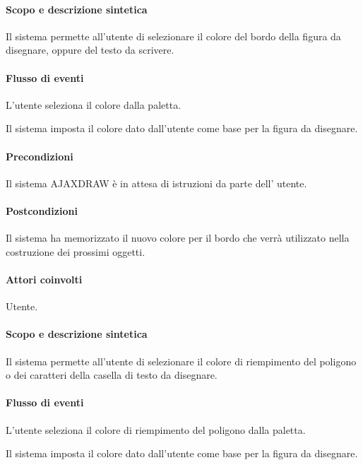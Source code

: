 \paragraph{Scopo e descrizione sintetica} 
Il sistema permette all'utente di selezionare il colore del bordo della figura da disegnare, oppure del testo da scrivere.
\paragraph{Flusso di eventi}
\begin{elenconumerato}[\textbf{}]{\subsubsecindent}
\item L'utente seleziona il colore dalla paletta.
\item Il sistema imposta il colore dato dall'utente come base per la figura da disegnare.
\end{elenconumerato}
\paragraph{Precondizioni} Il sistema AJAXDRAW \`e in attesa di istruzioni da parte dell' utente.
\paragraph{Postcondizioni} Il sistema ha memorizzato il nuovo colore per il bordo che verr\`a utilizzato nella costruzione dei prossimi oggetti.

\paragraph{Attori coinvolti} Utente.
\paragraph{Scopo e descrizione sintetica} 
Il sistema permette all'utente di selezionare il colore di riempimento del poligono o dei caratteri della casella di testo da disegnare.
\paragraph{Flusso di eventi}
\begin{elenconumerato}[\textbf{}]{\subsubsecindent}
\item L'utente seleziona il colore di riempimento del poligono dalla paletta.
\item Il sistema imposta il colore dato dall'utente come base per la figura da disegnare.
\end{elenconumerato}
